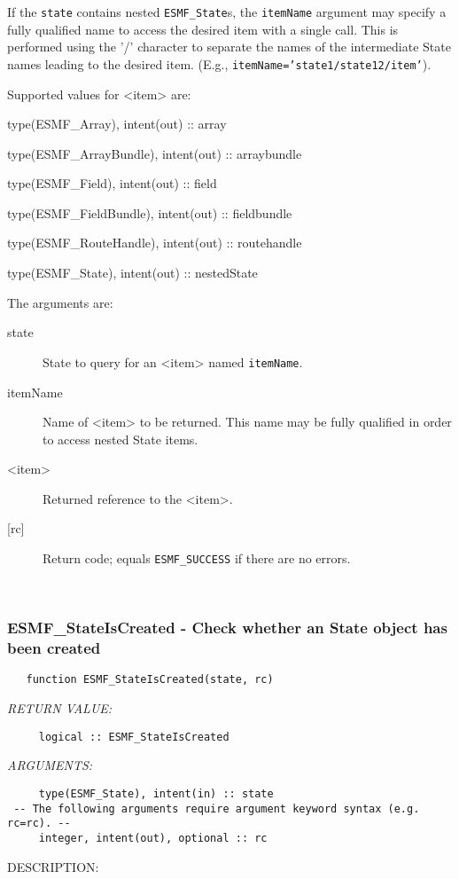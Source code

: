    If the {\tt state} contains nested {\tt ESMF\_State}s,
   the {\tt itemName} argument may specify a fully qualified name
   to access the desired item with a single call. This is performed
   using the '/' character to separate the names of the intermediate
   State names leading to the desired item. (E.g.,
   {\tt itemName='state1/state12/item'}).
  
   Supported values for <item> are:
   \begin{description}
   \item type(ESMF\_Array), intent(out) :: array
   \item type(ESMF\_ArrayBundle), intent(out) :: arraybundle
   \item type(ESMF\_Field), intent(out) :: field
   \item type(ESMF\_FieldBundle), intent(out) :: fieldbundle
   \item type(ESMF\_RouteHandle), intent(out) :: routehandle
   \item type(ESMF\_State), intent(out) :: nestedState
   \end{description}
  
   The arguments are:
   \begin{description}
   \item[state]
   State to query for an <item> named {\tt itemName}.
   \item[itemName]
   Name of <item> to be returned. This name may be fully
   qualified in order to access nested State items.
   \item[<item>]
   Returned reference to the <item>.
   \item[{[rc]}]
   Return code; equals {\tt ESMF\_SUCCESS} if there are no errors.
   \end{description}
   
 
\mbox{}\hrulefill\ 
 
\subsubsection [ESMF\_StateIsCreated] {ESMF\_StateIsCreated - Check whether an State object has been created}


\begin{verbatim}   function ESMF_StateIsCreated(state, rc)\end{verbatim}{\em RETURN VALUE:}
\begin{verbatim}     logical :: ESMF_StateIsCreated\end{verbatim}{\em ARGUMENTS:}
\begin{verbatim}     type(ESMF_State), intent(in) :: state
 -- The following arguments require argument keyword syntax (e.g. rc=rc). --
     integer, intent(out), optional :: rc\end{verbatim}
{\sf DESCRIPTION:\\ }


